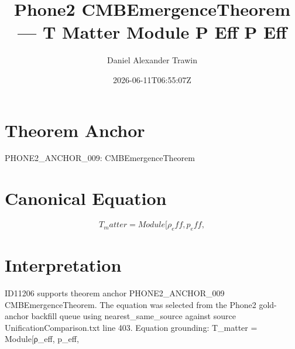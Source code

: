 \documentclass[11pt]{article}
\title{Phone2 CMBEmergenceTheorem — T Matter Module Ρ Eff P Eff}
\author{Daniel Alexander Trawin}
\date{2026-06-11T06:55:07Z}
\begin{document}
\maketitle
\section*{Theorem Anchor}
PHONE2_ANCHOR_009: CMBEmergenceTheorem
\section*{Canonical Equation}
\[
T_matter = Module[{ρ_eff, p_eff},
\]
\section*{Interpretation}
ID11206 supports theorem anchor PHONE2_ANCHOR_009 CMBEmergenceTheorem. The equation was selected from the Phone2 gold-anchor backfill queue using nearest_same_source against source UnificationComparison.txt line 403. Equation grounding: T_matter = Module[{ρ_eff, p_eff},
\end{document}
